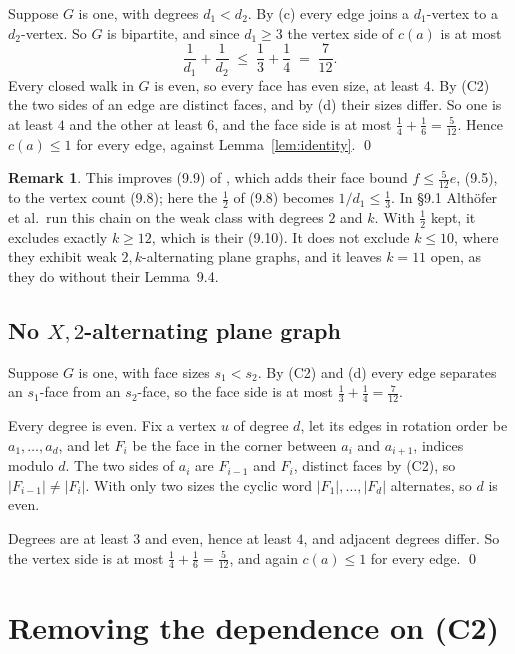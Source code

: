 \documentclass[11pt,a4paper]{amsart}
\theoremstyle{plain}
\theoremstyle{definition}
\newtheorem{remark}[theorem]{Remark}
\begin{document}
Suppose $G$ is one, with degrees $d_1 < d_2$. By (c) every edge joins a
$d_1$-vertex to a $d_2$-vertex. So $G$ is bipartite, and since $d_1 \ge 3$ the
vertex side of $c(a)$ is at most
\[
  \frac{1}{d_1} + \frac{1}{d_2} \;\le\; \frac13 + \frac14 \;=\; \frac{7}{12}.
\]
Every closed walk in $G$ is even, so every face has even size, at least $4$. By
(C2) the two sides of an edge are distinct faces, and by (d) their sizes differ.
So one is at least $4$ and the other at least $6$, and the face side is at most
$\tfrac14 + \tfrac16 = \tfrac{5}{12}$. Hence $c(a) \le 1$ for every edge,
against Lemma~\ref{lem:identity}. \qed

\begin{remark}
This improves (9.9) of \cite{AHSSV2015}, which adds their face bound
$f \le \frac5{12}e$, (9.5), to the vertex count (9.8); here the $\frac12$ of
(9.8) becomes $1/d_1 \le \frac13$. In \S9.1 Alth\"ofer et al.\ run this chain
on the weak class with degrees $2$ and $k$. With $\tfrac12$ kept, it excludes exactly $k \ge 12$, which is their
(9.10). It does not exclude $k \le 10$, where they exhibit weak
$2,k$-alternating plane graphs, and it leaves $k = 11$ open, as they do without
their Lemma~9.4.
\end{remark}

\subsection{No $X,2$-alternating plane graph}\label{sec:halftwo}

Suppose $G$ is one, with face sizes $s_1 < s_2$. By (C2) and (d) every edge
separates an $s_1$-face from an $s_2$-face, so the face side is at most
$\tfrac13 + \tfrac14 = \tfrac{7}{12}$.

Every degree is even. Fix a vertex $u$ of degree $d$, let its edges in rotation
order be $a_1,\dots,a_d$, and let $F_i$ be the face in the corner between $a_i$
and $a_{i+1}$, indices modulo $d$. The two sides of $a_i$ are $F_{i-1}$ and
$F_i$, distinct faces by (C2), so $|F_{i-1}| \ne |F_i|$. With only two sizes
the cyclic word $|F_1|,\dots,|F_d|$ alternates, so $d$ is even.

Degrees are at least $3$ and even, hence at least $4$, and adjacent degrees
differ. So the vertex side is at most $\tfrac14+\tfrac16 = \tfrac{5}{12}$, and
again $c(a) \le 1$ for every edge. \qed

\section{Removing the dependence on (C2)}\label{sec:c2}
\end{document}
